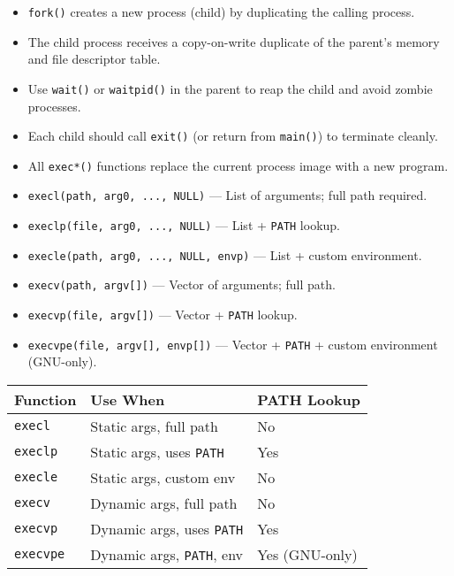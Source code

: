 \documentclass[8pt,twocolumn]{article}
\begin{document}
\begin{itemize}[leftmargin=2em]
    \setlength{\itemsep}{0pt} %
    \setlength{\parskip}{0pt}
    \item \texttt{fork()} creates a new process (child) by duplicating the calling process.
    \item The child process receives a copy-on-write duplicate of the parent's memory and file descriptor table.
    \item Use \texttt{wait()} or \texttt{waitpid()} in the parent to reap the child and avoid zombie processes.
    \item Each child should call \texttt{exit()} (or return from \texttt{main()}) to terminate cleanly.
    \item All \texttt{exec*()} functions replace the current process image with a new program.
    \item \texttt{execl(path, arg0, ..., NULL)} — List of arguments; full path required.
    \item \texttt{execlp(file, arg0, ..., NULL)} — List + \texttt{PATH} lookup.
    \item \texttt{execle(path, arg0, ..., NULL, envp)} — List + custom environment.
    \item \texttt{execv(path, argv[])} — Vector of arguments; full path.
    \item \texttt{execvp(file, argv[])} — Vector + \texttt{PATH} lookup.
    \item \texttt{execvpe(file, argv[], envp[])} — Vector + \texttt{PATH} + custom environment (GNU-only).
\end{itemize}
\begin{center}
\vspace{-1.0em}
\begin{tabular}{|l|l|l|}
\hline
\textbf{Function} & \textbf{Use When} & \textbf{PATH Lookup} \\
\hline
\texttt{execl}    & Static args, full path     & No  \\
\hline

\texttt{execlp}   & Static args, uses \texttt{PATH} & Yes \\
\hline

\texttt{execle}   & Static args, custom env    & No  \\
\hline

\texttt{execv}    & Dynamic args, full path    & No  \\
\hline

\texttt{execvp}   & Dynamic args, uses \texttt{PATH} & Yes \\
\hline

\texttt{execvpe}  & Dynamic args, \texttt{PATH}, env & Yes (GNU-only) \\
\hline
\end{tabular}
\vspace{-1.0em}
\end{center}
\end{document}
